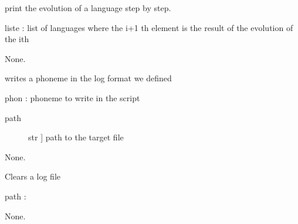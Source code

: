 \documentclass[letterpaper,10pt,english]{sphinxmanual}
\begin{document}

\begin{fulllineitems}
\label{\detokenize{index:log_utilities.lgs2log}}
\sphinxAtStartPar
print the evolution of a language step by step.

\sphinxAtStartPar
liste : list of languages where the i+1 th element is the result of the evolution of the ith

\sphinxAtStartPar
None.

\end{fulllineitems}


\begin{fulllineitems}
\label{\detokenize{index:log_utilities.phon2log}}
\sphinxAtStartPar
writes a phoneme in the log format we defined

\sphinxAtStartPar
phon : phoneme to write in the script
\begin{description}
\item[{path}] \leavevmode{[}str {]}
\sphinxAtStartPar
path to the target file

\end{description}

\sphinxAtStartPar
None.

\end{fulllineitems}


\begin{fulllineitems}
\label{\detokenize{index:log_utilities.purge_log}}
\sphinxAtStartPar
Clears a log file

\sphinxAtStartPar
path :

\sphinxAtStartPar
None.

\end{fulllineitems}
\end{document}
